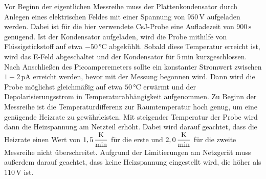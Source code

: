 Vor Beginn der eigentlichen Messreihe muss der Plattenkondensator durch Anlegen eines elektrischen Feldes mit einer Spannung von $950 \,\si{\volt}$ aufgeladen werden.
Dabei ist für die hier verwendete CsJ-Probe eine Aufladezeit von $900 \,\si{\second}$ genügend.
Ist der Kondensator aufgeladen, wird die Probe mithilfe von Flüssigstickstoff auf etwa $-50 \,\si{\celsius}$ abgekühlt.
Sobald diese Temperatur erreicht ist, wird das E-Feld abgeschaltet und der Kondensator für $5 \,\si{\minute}$ kurzgeschlossen.
Nach Anschließen des Picoamperemeters sollte ein konstanter Stromwert zwischen $1-2 \,\si{\pico\ampere}$ erreicht werden, bevor mit der Messung begonnen wird.
Dann wird die Probe möglichst gleichmäßig auf etwa $50 \,\si{\celsius}$ erwärmt und der Depolarisierungsstrom in Temperaturabhängigkeit aufgenommen.
Zu Beginn der Messreihe ist die Temperaturdifferenz zur Raumtemperatur hoch genug, um eine genügende Heizrate zu gewährleisten.
Mit steigender Temperatur der Probe wird dann die Heizspannung am Netzteil erhöht.
Dabei wird darauf geachtet, dass die Heizrate einen Wert von $1,5 \, \unit{\dfrac{\kelvin}{\minute}}$ für die erste und $2,0 \, \unit{\dfrac{\kelvin}{\minute}}$ für die zweite Messreihe nicht überschreitet. 
Aufgrund der Limitierungen am Netzgerät muss außerdem darauf geachtet, dass keine Heizspannung eingestellt wird, die höher als $110 \,\si{\volt}$ ist. 
